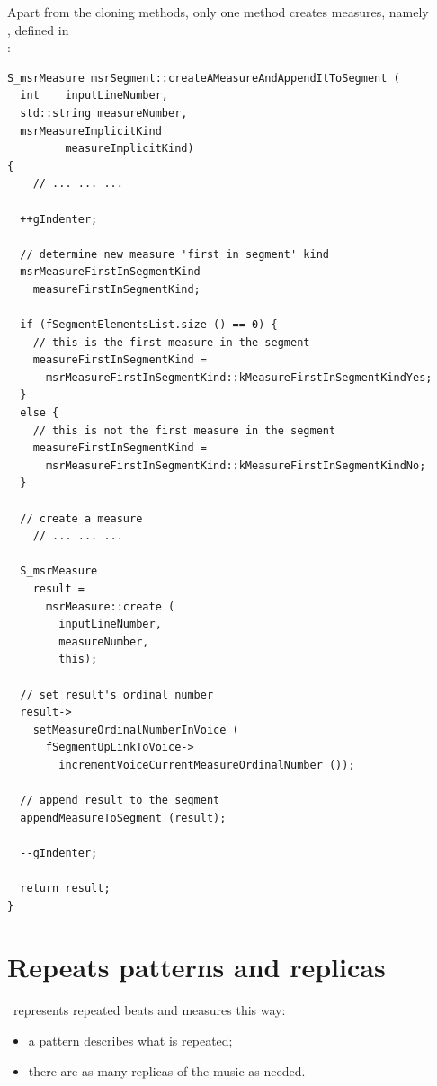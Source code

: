 Apart from the cloning methods, only one method creates measures, namely\\
, defined in\\
:
\begin{lstlisting}[language=CPlusPlus]
S_msrMeasure msrSegment::createAMeasureAndAppendItToSegment (
  int    inputLineNumber,
  std::string measureNumber,
  msrMeasureImplicitKind
         measureImplicitKind)
{
	// ... ... ...

  ++gIndenter;

  // determine new measure 'first in segment' kind
  msrMeasureFirstInSegmentKind
    measureFirstInSegmentKind;

  if (fSegmentElementsList.size () == 0) {
    // this is the first measure in the segment
    measureFirstInSegmentKind =
      msrMeasureFirstInSegmentKind::kMeasureFirstInSegmentKindYes;
  }
  else {
    // this is not the first measure in the segment
    measureFirstInSegmentKind =
      msrMeasureFirstInSegmentKind::kMeasureFirstInSegmentKindNo;
  }

  // create a measure
	// ... ... ...

  S_msrMeasure
    result =
      msrMeasure::create (
        inputLineNumber,
        measureNumber,
        this);

  // set result's ordinal number
  result->
    setMeasureOrdinalNumberInVoice (
      fSegmentUpLinkToVoice->
        incrementVoiceCurrentMeasureOrdinalNumber ());

  // append result to the segment
  appendMeasureToSegment (result);

  --gIndenter;

  return result;
}
\end{lstlisting}


\section{Repeats patterns and replicas}\label{Repeats patterns and replicas}

\msrRepr\ represents repeated beats and measures this way:
\begin{itemize}
\item a pattern describes what is repeated;
\item there are as many replicas of the music as needed.
\end{itemize}

